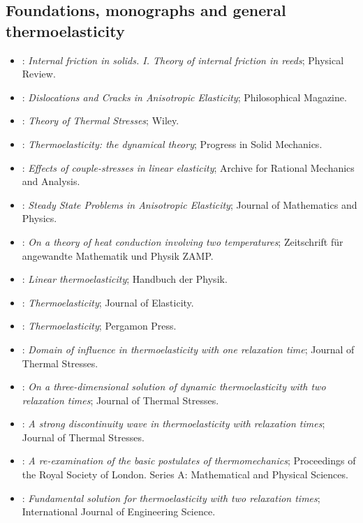 \subsection{Foundations, monographs and general thermoelasticity}
\begin{itemize}\itemsep0pt\small
\item \citet{Zener1937}: \emph{Internal friction in solids. I. Theory of internal friction in reeds}; Physical Review.
\item \citet{Stroh1958}: \emph{Dislocations and Cracks in Anisotropic Elasticity}; Philosophical Magazine.
\item \citet{Boley1960}: \emph{Theory of Thermal Stresses}; Wiley.
\item \citet{Chadwick1960}: \emph{Thermoelasticity: the dynamical theory}; Progress in Solid Mechanics.
\item \citet{MindlinTiersten1962}: \emph{Effects of couple-stresses in linear elasticity}; Archive for Rational Mechanics and Analysis.
\item \citet{Stroh1962}: \emph{Steady State Problems in Anisotropic Elasticity}; Journal of Mathematics and Physics.
\item \citet{ChenGurtin1968}: \emph{On a theory of heat conduction involving two temperatures}; Zeitschrift für angewandte Mathematik und Physik ZAMP.
\item \citet{Carlson1972}: \emph{Linear thermoelasticity}; Handbuch der Physik.
\item \citet{Green1972}: \emph{Thermoelasticity}; Journal of Elasticity.
\item \citet{Nowacki1975}: \emph{Thermoelasticity}; Pergamon Press.
\item \citet{Ignaczak1980}: \emph{Domain of influence in thermoelasticity with one relaxation time}; Journal of Thermal Stresses.
\item \citet{Ignaczak1981}: \emph{On a three-dimensional solution of dynamic thermoelasticity with two relaxation times}; Journal of Thermal Stresses.
\item \citet{Ignaczak1985}: \emph{A strong discontinuity wave in thermoelasticity with relaxation times}; Journal of Thermal Stresses.
\item \citet{Green1991}: \emph{A re-examination of the basic postulates of thermomechanics}; Proceedings of the Royal Society of London. Series A: Mathematical and Physical Sciences.
\item \citet{Sherief1992}: \emph{Fundamental solution for thermoelasticity with two relaxation times}; International Journal of Engineering Science.

\end{itemize}
